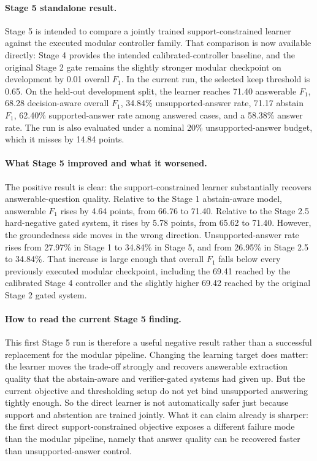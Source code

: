 \paragraph{Stage 5 standalone result.}
Stage 5 is intended to compare a jointly trained support-constrained learner
against the executed modular controller family.
That comparison is now available directly: Stage 4 provides the intended
calibrated-controller baseline, and the original Stage 2 gate remains the
slightly stronger modular checkpoint on development by 0.01 overall \(F_1\).
In the current run, the selected keep threshold is 0.65.
On the held-out development split, the learner reaches 71.40 answerable
$F_1$, 68.28 decision-aware overall $F_1$, 34.84\% unsupported-answer rate,
71.17 abstain $F_1$, 62.40\% supported-answer rate among answered cases, and a
58.38\% answer rate.
The run is also evaluated under a nominal 20\% unsupported-answer budget, which
it misses by 14.84 points.

\paragraph{What Stage 5 improved and what it worsened.}
The positive result is clear:
the support-constrained learner substantially recovers answerable-question
quality.
Relative to the Stage 1 abstain-aware model, answerable $F_1$ rises by 4.64
points, from 66.76 to 71.40.
Relative to the Stage 2.5 hard-negative gated system, it rises by 5.78 points,
from 65.62 to 71.40.
However, the groundedness side moves in the wrong direction.
Unsupported-answer rate rises from 27.97\% in Stage 1 to 34.84\% in Stage 5,
and from 26.95\% in Stage 2.5 to 34.84\%.
That increase is large enough that overall $F_1$ falls below every previously
executed modular checkpoint, including the 69.41 reached by the calibrated
Stage 4 controller and the slightly higher 69.42 reached by the original
Stage 2 gated system.

\paragraph{How to read the current Stage 5 finding.}
This first Stage 5 run is therefore a useful negative result rather than a
successful replacement for the modular pipeline.
Changing the learning target does matter:
the learner moves the trade-off strongly and recovers answerable extraction
quality that the abstain-aware and verifier-gated systems had given up.
But the current objective and thresholding setup do not yet bind unsupported
answering tightly enough.
So the direct learner is not automatically safer just because support and
abstention are trained jointly.
What it can claim already is sharper:
the first direct support-constrained objective exposes a different failure mode
than the modular pipeline, namely that answer quality can be recovered faster
than unsupported-answer control.

